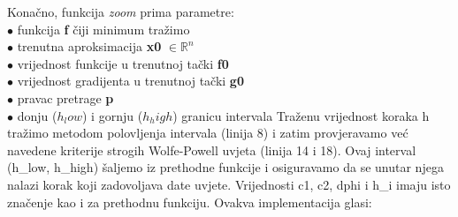 \documentclass[bosnian,12pt,a4paper]{report}
\begin{document}
\justify
Konačno, funkcija \textit{zoom} prima parametre:\\
\hspace*{1cm}$\bullet$ funkcija \textbf{f} čiji minimum tražimo\\
\hspace*{1cm}$\bullet$ trenutna aproksimacija \textbf{x0}  $ \in \mathbb{R}^n$\\
\hspace*{1cm}$\bullet$ vrijednost funkcije u trenutnoj tački \textbf{f0} \\
\hspace*{1cm}$\bullet$ vrijednost gradijenta u trenutnoj tački \textbf{g0} \\
\hspace*{1cm}$\bullet$ pravac pretrage \textbf{p} \\
\hspace*{1cm}$\bullet$ donju ($h_low$) i gornju ($h_high$) granicu intervala 
\justify
Traženu vrijednost koraka h tražimo metodom polovljenja intervala (linija 8) i zatim provjeravamo već navedene kriterije strogih Wolfe-Powell uvjeta (linija 14 i 18). Ovaj interval (h_low, h_high) šaljemo iz prethodne funkcije i osiguravamo da se unutar njega nalazi korak koji zadovoljava date uvjete. Vrijednosti c1, c2, dphi i h_i imaju isto značenje kao i za prethodnu funkciju. Ovakva implementacija glasi: \\


\vspace*{0.5cm} 
\end{document}
